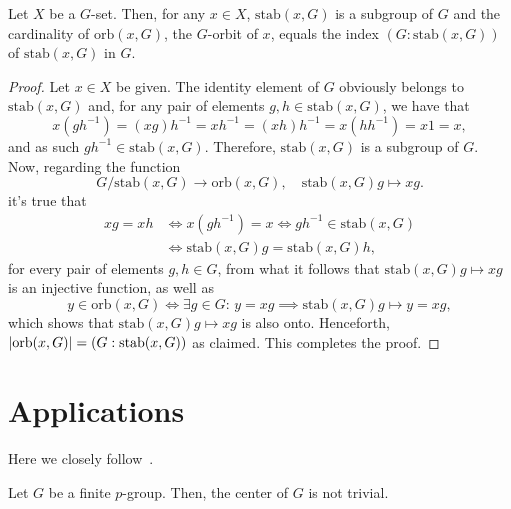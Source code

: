 \begin{proposition}\label{prop:cardinality-of-orbits}
  Let \(X\) be a \(G\)-set. Then, for any \(x\in{X}\), \(\text{stab}(x,G)\) is a subgroup of \(G\) and the cardinality of \(\text{orb}(x,G)\), the \(G\)-orbit of \(x\), equals the index \((G:\text{stab}(x,G))\) of \(\text{stab}(x,G)\) in \(G\).
\end{proposition}

\begin{proof}
  Let \(x\in{X}\) be given. The identity element of \(G\) obviously belongs to \(\text{stab}(x,G)\) and, for any pair of elements \(g,h\in{\text{stab}(x,G)}\), we have that
  \[
    x(gh^{-1})
    =
    (xg)h^{-1}
    =
    xh^{-1}
    =
    (xh)h^{-1}
    =
    x(hh^{-1})
    =
    x1
    =
    x,
  \]
  and as such \(gh^{-1}\in{\text{stab}(x,G)}\). Therefore, \(\text{stab}(x,G)\) is a subgroup of \(G\). Now, regarding the function
  \[
    G/\text{stab}(x,G)\to{\text{orb}(x,G)},
    \quad
    \text{stab}(x,G)g\mapsto{xg}.
  \]
  it's true that
  \begin{align*}
    xg=xh
    &\iff
    x(gh^{-1})=x
    \iff
    gh^{-1}\in{\text{stab}(x,G)}
    \\
    &\iff
    \text{stab}(x,G)g=\text{stab}(x,G)h,
  \end{align*}
  for every pair of elements \(g,h\in{G}\), from what it follows that \(\text{stab}(x,G)g\mapsto{xg}\) is an injective function, as well as
  \[
    y\in{\text{orb}(x,G)}
    \iff
    \exists{g\in{G}}:\,
    y=xg
    \implies
    \text{stab}(x,G)g\mapsto{y=xg},
  \]
  which shows that \(\text{stab}(x,G)g\mapsto{xg}\) is also onto. Henceforth, \(\lvert\text{orb}(x,G)\rvert=(G:\text{stab}(x,G))\) as claimed. This completes the proof.
\end{proof}

\section{Applications}\label{sec:applications}

Here we closely follow~\cite{herstein2010TopicsAlgebra}.

\begin{proposition}\label{prop:class-equation}
  Let \(G\) be a finite \(p\)-group. Then, the center of \(G\) is not trivial.
\end{proposition}

